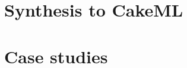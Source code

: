 \documentclass[global,twocolumn]{svjour}
\newif\ifREVISIONS
\begin{document}
\ifREVISIONS
\subsection{Revisions}
\begin{compactitem}
  \item Add in intuitive definition or AGREE leaf-component semantics
  \item State well-formed theorem
  \item State correctness theorem or any key theorems to the synthesis proof
\end{compactitem}
\fi

\section{Synthesis to CakeML}
\label{sec:synthesis}


\ifREVISIONS
\subsection{Revisions}
\begin{compactitem}
  \item State theorem relating the step function to the meaning of the leaf-node semantics
\end{compactitem}
\fi

\section{Case studies}
\label{sec:case-study}


\ifREVISIONS
\end{document}
